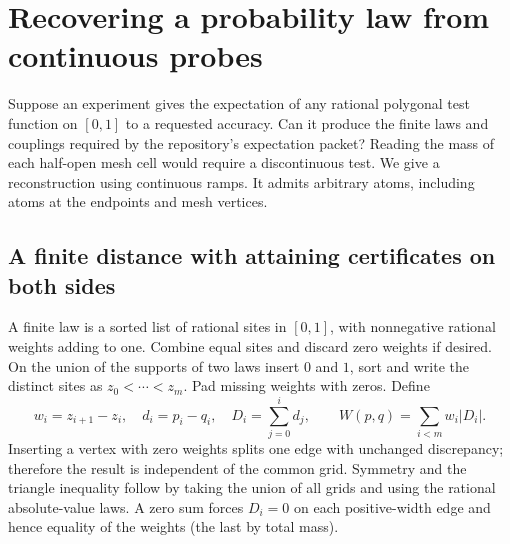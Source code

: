 \section{Recovering a probability law from continuous probes}
\label{sec:laws}

Suppose an experiment gives the expectation of any rational polygonal test
function on $[0,1]$ to a requested accuracy. Can it produce the finite laws and
couplings required by the repository's expectation packet? Reading the mass
of each half-open mesh cell would require a discontinuous test. We give a
reconstruction using continuous ramps. It admits arbitrary atoms, including
atoms at the endpoints and mesh vertices.

\subsection{A finite distance with attaining certificates on both sides}

A finite law is a sorted list of rational sites in $[0,1]$, with nonnegative rational
weights adding to one. Combine equal sites and discard zero weights if desired.
On the union of the supports of two laws insert $0$ and $1$, sort and write the
distinct sites as $z_0<\cdots<z_m$. Pad missing weights with zeros. Define
\[
 w_i=z_{i+1}-z_i,\quad d_i=p_i-q_i,\quad D_i=\sum_{j=0}^{i}d_j,
 \qquad W(p,q)=\sum_{i<m} w_i |D_i| .
\]
Inserting a vertex with zero weights splits one edge with unchanged discrepancy;
therefore the result is independent of the common grid. Symmetry and the
triangle inequality follow by taking the union of all grids and using the
rational absolute-value laws. A zero sum forces $D_i=0$ on each positive-width
edge and hence equality of the weights (the last by total mass).

